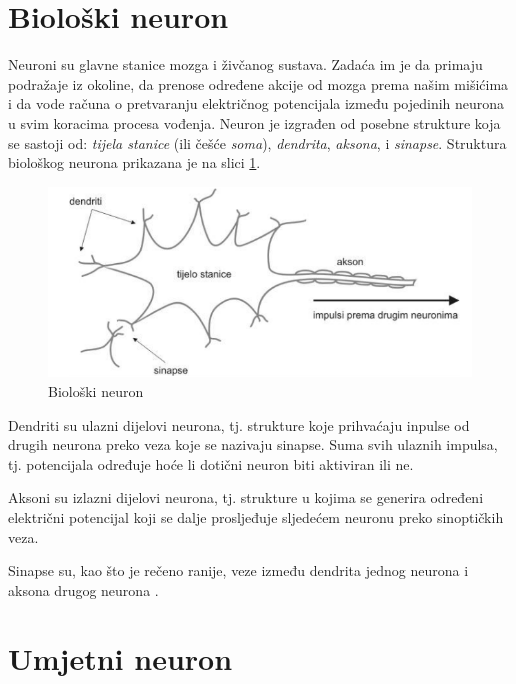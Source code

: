 \documentclass[times, utf8, zavrsni]{fer}
\begin{document}
\section{Biološki neuron}
Neuroni  su glavne stanice mozga i živčanog sustava. Zadaća im je da primaju podražaje iz okoline, da prenose određene akcije od mozga prema našim mišićima i da vode računa o pretvaranju električnog potencijala između pojedinih neurona u svim koracima procesa vođenja. Neuron je izgrađen od posebne strukture koja se sastoji od: \textit{tijela stanice} (ili češće \textit{soma}), \textit{dendrita}, \textit{aksona}, i \textit{sinapse}. Struktura biološkog neurona prikazana je na slici \ref{fig:bio-neuron}.

\begin{figure}[H]
    \centering
    \includegraphics[scale=0.75]{img/bio-neuron.png}
    \caption[Caption for LOF]{Biološki neuron\footnotemark}
    \label{fig:bio-neuron}
\end{figure}

Dendriti  su ulazni dijelovi neurona, tj. strukture koje prihvaćaju inpulse od drugih neurona preko veza koje se nazivaju sinapse. Suma svih ulaznih impulsa, tj. potencijala određuje hoće li dotični neuron biti aktiviran ili ne.

Aksoni  su izlazni dijelovi neurona, tj. strukture u kojima se generira određeni električni potencijal koji se dalje prosljeđuje sljedećem neuronu preko sinoptičkih veza.

Sinapse  su, kao što je rečeno ranije, veze između dendrita jednog neurona i aksona drugog neurona \citep{bioNeuron}.

\section{Umjetni neuron}
\end{document}
